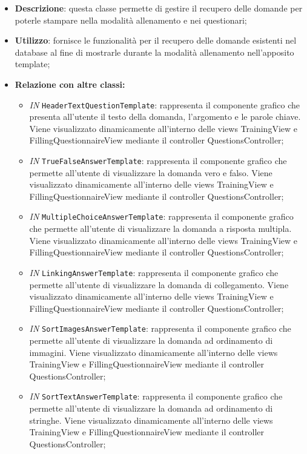 \begin{itemize}
	\item \textbf{Descrizione}: questa classe permette di gestire il recupero delle domande per poterle stampare nella modalità allenamento e nei questionari;
	\item \textbf{Utilizzo}: fornisce le funzionalità per il recupero delle domande esistenti nel database al fine di mostrarle durante la modalità allenamento nell'apposito template;
	\item \textbf{Relazione con altre classi:}
	\begin{itemize}
		\item \textit{IN} \texttt{HeaderTextQuestionTemplate}: rappresenta il componente grafico che presenta all'utente il testo della domanda, l'argomento e le parole chiave. Viene visualizzato dinamicamente all'interno delle views TrainingView e FillingQuestionnaireView mediante il controller QuestionsController;
		\item \textit{IN} \texttt{TrueFalseAnswerTemplate}: rappresenta il componente grafico che permette all'utente di visualizzare la domanda vero e falso. Viene visualizzato dinamicamente all'interno delle views TrainingView e FillingQuestionnaireView mediante il controller QuestionsController;
		\item \textit{IN} \texttt{MultipleChoiceAnswerTemplate}: rappresenta il componente grafico che permette all'utente di visualizzare la domanda a risposta multipla. Viene visualizzato dinamicamente all'interno delle views TrainingView e FillingQuestionnaireView mediante il controller QuestionsController;
		\item \textit{IN} \texttt{LinkingAnswerTemplate}: rappresenta il componente grafico che permette all'utente di visualizzare la domanda di collegamento. Viene visualizzato dinamicamente all'interno delle views TrainingView e FillingQuestionnaireView mediante il controller QuestionsController;
		\item \textit{IN} \texttt{SortImagesAnswerTemplate}: rappresenta il componente grafico che permette all'utente di visualizzare la domanda ad ordinamento di immagini. Viene visualizzato dinamicamente all'interno delle views TrainingView e FillingQuestionnaireView mediante il controller QuestionsController;
		\item \textit{IN} \texttt{SortTextAnswerTemplate}: rappresenta il componente grafico che permette all'utente di visualizzare la domanda ad ordinamento di stringhe. Viene visualizzato dinamicamente all'interno delle views TrainingView e FillingQuestionnaireView mediante il controller QuestionsController;

\end{itemize}
\end{itemize}
